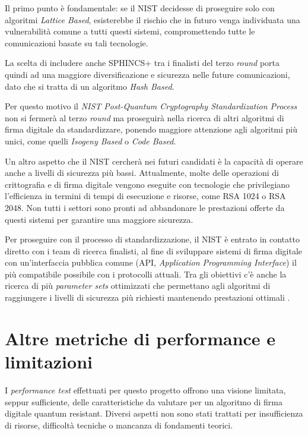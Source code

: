Il primo punto è fondamentale: se il NIST decidesse di proseguire solo con algoritmi \textit{Lattice Based}, esisterebbe il rischio che in futuro venga individuata una vulnerabilità comune a tutti questi sistemi, compromettendo tutte le comunicazioni basate su tali tecnologie.

La scelta di includere anche SPHINCS+ tra i finalisti del terzo \textit{round} porta quindi ad una maggiore diversificazione e sicurezza nelle future comunicazioni, dato che si tratta di un algoritmo \textit{Hash Based}.

Per questo motivo il \textit{NIST Post-Quantum Cryptography Standardization Process} \cite{nist-pqc} non si fermerà al terzo \textit{round} ma proseguirà nella ricerca di altri algoritmi di firma digitale da standardizzare, ponendo maggiore attenzione agli algoritmi più unici, come quelli \textit{Isogeny Based} o \textit{Code Based}.

Un altro aspetto che il NIST cercherà nei futuri candidati è la capacità di operare anche a livelli di sicurezza più bassi. Attualmente, molte delle operazioni di crittografia e di firma digitale vengono eseguite con tecnologie che privilegiano l'efficienza in termini di tempi di esecuzione e risorse, come RSA 1024 o RSA 2048. Non tutti i settori sono pronti ad abbandonare le prestazioni offerte da questi sistemi per garantire una maggiore sicurezza.

Per proseguire con il processo di standardizzazione, il NIST è entrato in contatto diretto con i team di ricerca finalisti, al fine di sviluppare sistemi di firma digitale con un'interfaccia pubblica comune (API, \textit{Application Programming Interface}) il più compatibile possibile con i protocolli attuali. Tra gli obiettivi c'è anche la ricerca di più \textit{parameter sets} ottimizzati che permettano agli algoritmi di raggiungere i livelli di sicurezza più richiesti mantenendo prestazioni ottimali \cite{NISTthirdReport}.

\section{Altre metriche di performance e limitazioni}

I \textit{performance test} effettuati per questo progetto offrono una visione limitata, seppur sufficiente, delle caratteristiche da valutare per un algoritmo di firma digitale quantum resistant. Diversi aspetti non sono stati trattati per insufficienza di risorse, difficoltà tecniche o mancanza di fondamenti teorici.

